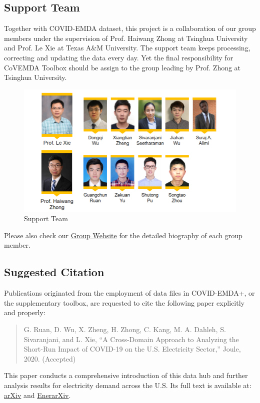 \documentclass[11pt]{article}
\numberwithin{equation}{section}
\numberwithin{table}{section}
\numberwithin{figure}{section}
\begin{document}
\subsection{Support Team}

Together with COVID-EMDA dataset, this project is a collaboration of our group members under the supervision of Prof. Haiwang Zhong at Tsinghua University and Prof. Le Xie at Texas A\&M University. The support team keeps processing, correcting and updating the data every day. Yet the final responsibility for CoVEMDA Toolbox should be assign to the group leading by Prof. Zhong at Tsinghua University.

\begin{figure}[!ht]
    \centering
    \includegraphics[width=.8\textwidth]{figures/contributor-extend-20210408.png}
    \caption{Support Team}
\end{figure}

Please also check our \href{https://gridx.engr.tamu.edu/?page_id=30}{Group Website} for the detailed biography of each group member.

\subsection{Suggested Citation}
Publications originated from the employment of data files in COVID-EMDA+, or the supplementary toolbox, are requested to cite the following paper explicitly and properly: 

\begin{quotation}\footnotesize
G. Ruan, D. Wu, X. Zheng, H. Zhong, C. Kang, M. A. Dahleh, S. Sivaranjani, and L. Xie, ``A Cross-Domain Approach to Analyzing the Short-Run Impact of COVID-19 on the U.S. Electricity Sector,'' Joule, 2020. (Accepted)
\end{quotation}

This paper conducts a comprehensive introduction of this data hub and further analysis results for electricity demand across the U.S. Its full text is available at: \href{https://arxiv.org/abs/2005.06631}{arXiv} and \href{http://www.enerarxiv.org/page/thesis.html?id=1840}{EnerarXiv}.
\end{document}

